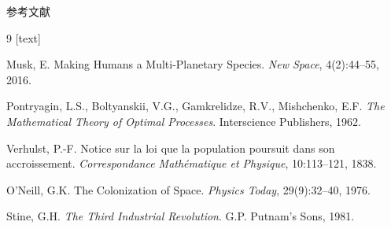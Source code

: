 \documentclass[aspectratio=169, 11pt]{beamer}
\begin{document}
\appendix

\begin{frame}[allowframebreaks]{参考文献}
  \begin{thebibliography}{9}
    [text]

    Musk, E.
    \newblock Making Humans a Multi-Planetary Species.
    \newblock \textit{New Space}, 4(2):44--55, 2016.

    Pontryagin, L.S., Boltyanskii, V.G., Gamkrelidze, R.V., Mishchenko, E.F.
    \newblock \textit{The Mathematical Theory of Optimal Processes}.
    \newblock Interscience Publishers, 1962.

    Verhulst, P.-F.
    \newblock Notice sur la loi que la population poursuit dans son accroissement.
    \newblock \textit{Correspondance Math\'{e}matique et Physique}, 10:113--121, 1838.

    O'Neill, G.K.
    \newblock The Colonization of Space.
    \newblock \textit{Physics Today}, 29(9):32--40, 1976.

    Stine, G.H.
    \newblock \textit{The Third Industrial Revolution}.
    \newblock G.P. Putnam's Sons, 1981.

  \end{thebibliography}

\end{frame}
\end{document}
